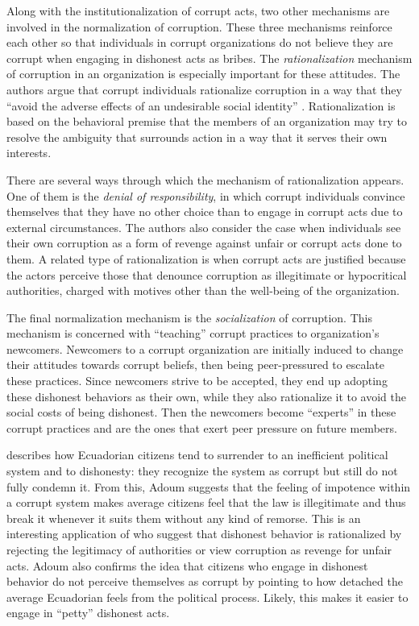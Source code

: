 \documentclass[12pt,a4]{article}\usepackage[]{graphicx}\usepackage[]{xcolor}
\begin{document}
Along with the institutionalization of corrupt acts, two other mechanisms are involved in the normalization of corruption. These three mechanisms reinforce each other so that individuals in corrupt organizations do not believe they are corrupt when engaging in dishonest acts as bribes. The \textit{rationalization} mechanism of corruption in an organization is especially important for these attitudes. The authors argue that corrupt individuals rationalize corruption in a way that they \enquote{avoid the adverse effects of an undesirable social identity} \parencite[p.13]{Ashforth.2003}. Rationalization is based on the behavioral premise that the members of an organization may try to resolve the ambiguity that surrounds action in a way that it serves their own interests. 

There are several ways through which the mechanism of rationalization appears. One of them is the \textit{denial of responsibility}, in which corrupt individuals convince themselves that they have no other choice than to engage in corrupt acts due to external circumstances. The authors also consider the case when individuals see their own corruption as a form of revenge against unfair or corrupt acts done to them. A related type of rationalization is when corrupt acts are justified because the actors perceive those that denounce corruption as illegitimate or hypocritical authorities, charged with motives other than the well-being of the organization.

The final normalization mechanism is the \textit{socialization} of corruption. This mechanism is concerned with \enquote{teaching} corrupt practices to organization's newcomers. Newcomers to a corrupt organization are initially induced to change their attitudes towards corrupt beliefs, then being peer-pressured to escalate these practices. Since newcomers strive to be accepted, they end up adopting these dishonest behaviors as their own, while they also rationalize it to avoid the social costs of being dishonest. Then the newcomers become \enquote{experts} in these corrupt practices and are the ones that exert peer pressure on future members.

\textcite{Adoum.2000} describes how Ecuadorian citizens tend to surrender to an inefficient political system and to dishonesty: they recognize the system as corrupt but still do not fully condemn it. From this, Adoum suggests that the feeling of impotence within a corrupt system makes average citizens feel that the law is illegitimate and thus break it whenever it suits them without any kind of remorse. This is an interesting application of \textcite{Ashforth.2003} who suggest that dishonest behavior is rationalized by rejecting the legitimacy of authorities or view corruption as revenge for unfair acts. Adoum also confirms the idea that citizens who engage in dishonest behavior do not perceive themselves as corrupt by pointing to how detached the average Ecuadorian feels from the political process. Likely, this makes it easier to engage in \enquote{petty} dishonest acts.
\end{document}
